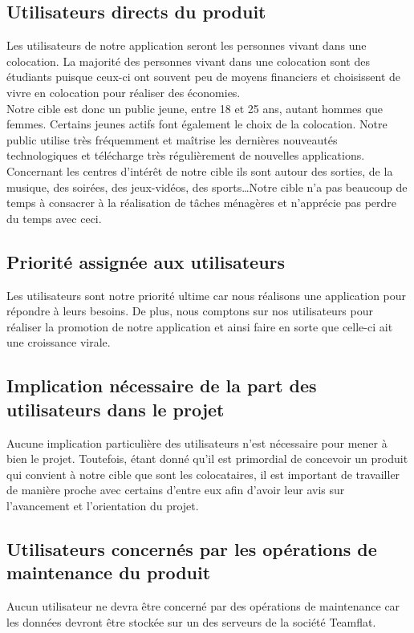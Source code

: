 \subsection{Utilisateurs directs du produit}
Les utilisateurs de notre application seront les personnes vivant dans une colocation. La majorité des personnes vivant dans une colocation sont des étudiants puisque ceux-ci ont souvent peu de moyens financiers et choisissent de vivre en colocation pour réaliser des économies.\\

Notre cible est donc un public jeune, entre 18 et 25 ans, autant hommes que femmes. Certains jeunes actifs font également le choix de la colocation. Notre public utilise très fréquemment et maîtrise les dernières nouveautés technologiques et télécharge très régulièrement de nouvelles applications.\\

Concernant les centres d'intérêt de notre cible ils sont autour des sorties, de la musique, des soirées, des jeux-vidéos, des sports\dots Notre cible n'a pas beaucoup de temps à consacrer à la réalisation de tâches ménagères et n'apprécie pas perdre du temps avec ceci. 

\subsection{Priorité assignée aux utilisateurs}
Les utilisateurs sont notre priorité ultime car nous réalisons une application pour répondre à leurs besoins. De plus, nous comptons sur nos utilisateurs pour réaliser la promotion de notre application et ainsi faire en sorte que celle-ci ait une croissance virale.

\subsection{Implication nécessaire de la part des utilisateurs dans le projet}
Aucune implication particulière des utilisateurs n'est nécessaire pour mener à bien le projet. Toutefois, étant donné qu'il est primordial de concevoir un produit qui convient à notre cible que sont les colocataires, il est important de travailler de manière proche avec certains d'entre eux afin d'avoir leur avis sur l'avancement et l'orientation du projet.

\subsection{Utilisateurs concernés par les opérations de maintenance du produit}
Aucun utilisateur ne devra être concerné par des opérations de maintenance car les données devront être stockée sur un des serveurs de la société Teamflat.